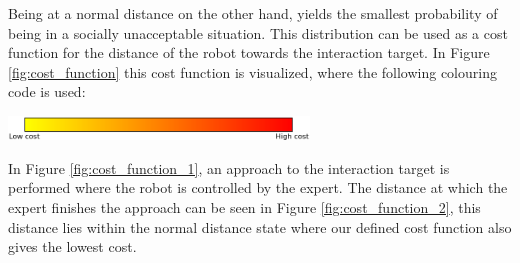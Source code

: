 \documentclass[a4paper,11pt]{report}
\begin{document}
Being at a normal distance on the other hand, yields the smallest probability of being in a socially unacceptable situation.
This distribution can be used as a cost function for the distance of the robot towards the interaction target.
In Figure \ref{fig:cost_function} this cost function is visualized, where the following colouring code is used:
\begin{center}
\includegraphics[width=0.6\textwidth]{figures/colour_bar.png}
\end{center}
In Figure \ref{fig:cost_function_1}, an approach to the interaction target is performed where the robot is controlled by the expert.
The distance at which the expert finishes the approach can be seen in Figure \ref{fig:cost_function_2}, this distance lies within the normal distance state where our defined cost function also gives the lowest cost.
\end{document}
